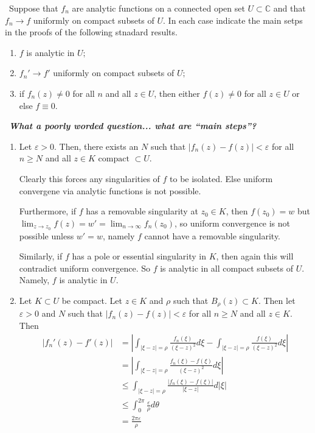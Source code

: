 \documentclass[12pt]{Qual}
\begin{document}
\begin{problem} $\,$
Suppose that $f_n$ are analytic functions on a connected open set $U\subset\mathbb{C}$ and that $f_n\to f$ uniformly on compact subsets of $U$. In each case indicate the main setps in the proofs of the following stnadard results.
\begin{enumerate}[label=(\alph*)]
    \item $f$ is analytic in $U;$
    \item $f_n'\to f'$ uniformly on compact subsets of $U;$
    \item if $f_n(z)\not=0$ for all $n$ and all $z\in U$, then either $f(z)\not=0$ for all $z\in U$ or else $f\equiv 0$.
\end{enumerate}
\end{problem}


\begin{solution}$\,$
\textit{\textbf{What a poorly worded question... what are ``main steps''?}}

\begin{enumerate}[label=(\alph*)]
    \item Let $\varepsilon>0$. Then, there exists an $N$ such that $|f_n(z)-f(z)|<\varepsilon$ for all $n\ge N$ and all $z\in K\text{ compact }\subset U$.

    Clearly this forces any singularities of $f$ to be isolated. Else uniform convergene via analytic functions is not possible.

    Furthermore, if $f$ has a removable singularity at $z_0\in K$, then $f(z_0)=w$ but $\lim_{z\to z_0}f(z)=w'=\lim_{n\to\infty}f_n(z_0)$, so uniform convergence is not possible unless $w'=w$, namely $f$ cannot have a removable singularity.

    Similarly, if $f$ has a pole or essential singularity in $K$, then again this will contradict uniform convergence. So $f$ is analytic in all compact subsets of $U$. Namely, $f$ is analytic in $U.$
    \item Let $K\subset U$ be compact. Let $z\in K$ and $\rho$ such that $B_\rho(z)\subset K$. Then let $\varepsilon>0$ and $N$ such that $|f_n(z)-f(z)|<\varepsilon$ for all $n\ge N$ and all $z\in K$. Then \begin{align*}
        \left|f_n'(z)-f'(z)\right|&=\left|\int_{|\xi-z|=\rho}\frac{f_n(\xi)}{(\xi-z)^2}d\xi-\int_{|\xi-z|=\rho}\frac{f(\xi)}{(\xi-z)^2}d\xi\right|\\
        &=\left|\int_{|\xi-z|=\rho}\frac{f_n(\xi)-f(\xi)}{(\xi-z)^2}d\xi\right|\\
        &\le\int_{|\xi-z|=\rho}\frac{|f_n(\xi)-f(\xi)|}{|\xi-z|}d|\xi|\\
        &\le\int_0^{2\pi}\frac{\varepsilon}{\rho}d\theta\\
        &=\frac{2\pi\varepsilon}{\rho}
    \end{align*}


\end{enumerate}
\end{solution}
\end{document}
